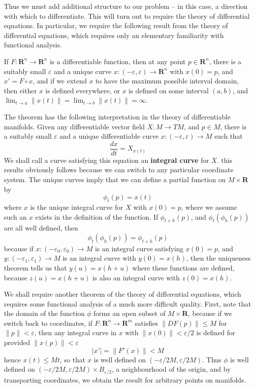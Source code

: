 Thus we must add additional structure to our problem -- in this case, a direction with which to differentiate. This will turn out to require the theory of differential equations. In particular, we require the following result from the theory of differential equations, which requires only an elementary familiarity with functional analysis.

\begin{theorem}
    If $F: \mathbf{R}^n \to \mathbf{R}^n$ is a differentiable function, then at any point $p \in \mathbf{R}^n$, there is a suitably small $\varepsilon$ and a unique curve $x: (-\varepsilon, \varepsilon) \to \mathbf{R}^n$ with $x(0) = p$, and $x' = F \circ x$, and if we extend $x$ to have the maximum possible interval domain, then either $x$ is defined everywhere, or $x$ is defined on some interval $(a,b)$, and $\lim_{t \to a} \| x(t) \| = \lim_{t \to b} \| x(t) \| = \infty$.
\end{theorem}

The theorem has the following interpretation in the theory of differentiable manifolds. Given any differentiable vector field $X: M \to TM$, and $p \in M$, there is a suitably small $\varepsilon$ and a unique differentiable curve $x: (-\varepsilon,\varepsilon) \to M$ such that
%
\[ \frac{dx}{dt} = X_{x(t)} \]
%
We shall call a curve satisfying this equation an {\bf integral curve} for $X$. this results obviously follows because we can switch to any particular coordinate system. The unique curves imply that we can define a partial function on $M \times \mathbf{R}$ by
%
\[ \phi_t(p) = x(t) \]
%
where $x$ is the unique integral curve for $X$ with $x(0) = p$, where we assume such an $x$ exists in the definition of the function. If $\phi_{t+h}(p)$, and $\phi_t(\phi_h(p))$ are all well defined, then
%
\[ \phi_t(\phi_h(p)) = \phi_{t + h}(p) \]
%
because if $x: (-\varepsilon_0,\varepsilon_0) \to M$ is an integral curve satisfying $x(0) = p$, and $y: (-\varepsilon_1, \varepsilon_1) \to M$ is an integral curve with $y(0) = x(h)$, then the uniqueness theorem tells us that $y(u) = x(h + u)$ where these functions are defined, because $z(u) = x(h + u)$ is also an integral curve with $z(0) = x(h)$.

We shall require another theorem of the theory of differential equations, which requires some functional analysis of a much more difficult quality. First, note that the domain of the function $\phi$ forms an open subset of $M \times \mathbf{R}$, because if we switch back to coordinates, if $F: \mathbf{R}^n \to \mathbf{R}^m$ satisfies $\| DF(p) \| \leq M$ for $\| p \| < \varepsilon$, then any integral curve in $x$ with $\| x(0) \| < \varepsilon/2$ is defined for provided $\| x(p) \| < \varepsilon$
%
\[ |x'| = \| F'(x) \| < M \]
%
hence $x(t) \leq Mt$, so that $x$ is well defined on $(-\varepsilon/2M,\varepsilon/2M)$. Thus $\phi$ is well defined on $(-\varepsilon/2M, \varepsilon/2M) \times B_{\varepsilon/2}$, a neighbourhood of the origin, and by transporting coordinates, we obtain the result for arbitrary points on manifolds. 

